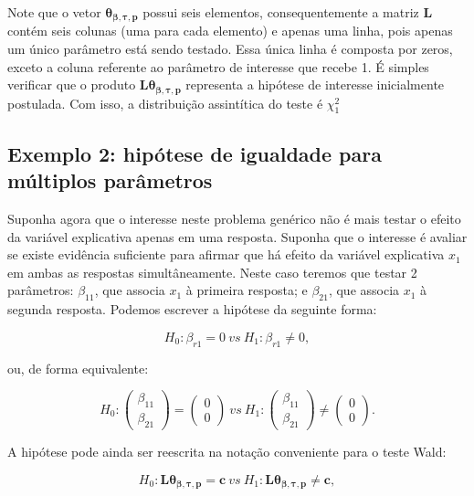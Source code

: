 Note que o vetor $\boldsymbol{\theta_{\beta,\tau,p}}$ possui seis elementos, consequentemente a matriz $\boldsymbol{L}$ contém seis colunas (uma para cada elemento) e apenas uma linha, pois apenas um único parâmetro está sendo testado. Essa única linha é composta por zeros, exceto a coluna referente ao parâmetro de interesse que recebe 1. É simples verificar que o produto $\boldsymbol{L}\boldsymbol{\theta_{\beta,\tau,p}}$ representa a hipótese de interesse inicialmente postulada. Com isso, a distribuição assintítica do teste é $\chi^2_1$

\subsection{Exemplo 2: hipótese de igualdade para múltiplos parâmetros}

Suponha agora que o interesse neste problema genérico não é mais testar o efeito da variável explicativa apenas em uma resposta. Suponha que o interesse é avaliar se existe evidência suficiente para afirmar que há efeito da variável explicativa $x_1$ em ambas as respostas simultâneamente. Neste caso teremos que testar 2 parâmetros: $\beta_{11}$, que associa $x_1$ à primeira resposta; e $\beta_{21}$, que associa $x_1$ à segunda resposta. Podemos escrever a hipótese da seguinte forma:

\begin{equation}
H_0: \beta_{r1} = 0 \ vs \ H_1: \beta_{r1} \neq 0,
\end{equation}

\noindent ou, de forma equivalente:

$$
H_0: 
\begin{pmatrix}
\beta_{11} \\ 
\beta_{21}
\end{pmatrix} 
= 
\begin{pmatrix}
0 \\ 
0
\end{pmatrix}
\ vs \ 
H_1: 
\begin{pmatrix}
\beta_{11} \\ 
\beta_{21}
\end{pmatrix} 
\neq
\begin{pmatrix}
0 \\ 
0 
\end{pmatrix}.
$$

A hipótese pode ainda ser reescrita na notação conveniente para o teste Wald:

\begin{equation}
H_0: \boldsymbol{L}\boldsymbol{\theta_{\beta,\tau,p}} = \boldsymbol{c} \ vs \ H_1: \boldsymbol{L}\boldsymbol{\theta_{\beta,\tau,p}} \neq \boldsymbol{c},
\end{equation}


